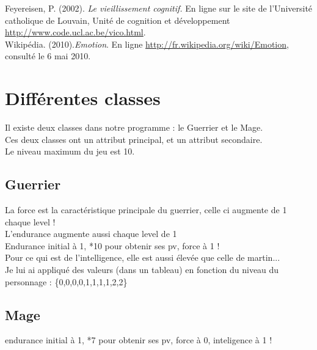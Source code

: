 \documentclass[a4paper,titlepage]{article}
\begin{document}
	Feyereisen, P. (2002). \textit{Le vieillissement cognitif.} En ligne sur le site de l’Université
catholique de Louvain, Unité de cognition et développement \url{http://www.code.ucl.ac.be/vico.html}.\\

	Wikipédia. (2010).\textit{Emotion}. En ligne \url{http://fr.wikipedia.org/wiki/Emotion}, consulté le 6 mai 2010. 
	
	
	\clearpage	
	\section*{Différentes classes}
		Il existe deux classes dans notre programme : le Guerrier et le Mage.\\
		Ces deux classes ont un attribut principal, et un attribut secondaire.\\
		Le niveau maximum du jeu est 10.
		
	\subsection*{Guerrier}
		La force est la caractéristique principale du guerrier, celle ci augmente de 1 chaque level !\\
		L'endurance augmente aussi chaque level de 1\\
		Endurance initial à 1, *10 pour obtenir ses pv, force à 1 !\\
		Pour ce qui est de l'intelligence, elle est aussi élevée que celle de martin...\\ Je lui ai appliqué des valeurs (dans un tableau) en fonction du niveau du personnage : 	\{0,0,0,0,1,1,1,1,2,2\}
		
	\subsection*{Mage}
		endurance initial à 1, *7 pour obtenir ses pv, force à 0, inteligence à 1 !
	
\end{document}
